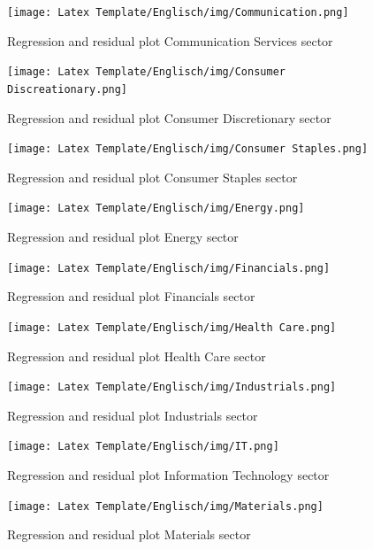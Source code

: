 \documentclass[a4paper,12pt]{article}
\begin{document}
\begin{figure}[!h]
  \centering
    \texttt{[image: Latex Template/Englisch/img/Communication.png]}
    \caption{Regression and residual plot Communication Services sector}
    \hfill
\end{figure}

\begin{figure}[!h]
  \centering
    \texttt{[image: Latex Template/Englisch/img/Consumer Discreationary.png]}
    \caption{Regression and residual plot Consumer Discretionary sector}
    \hfill
\end{figure}

\begin{figure}[!h]
  \centering
    \texttt{[image: Latex Template/Englisch/img/Consumer Staples.png]}
    \caption{Regression and residual plot Consumer Staples sector}
    \hfill
\end{figure}

\begin{figure}[!h]
  \centering
    \texttt{[image: Latex Template/Englisch/img/Energy.png]}
    \caption{Regression and residual plot Energy sector}
    \hfill
\end{figure}

\begin{figure}[!h]
  \centering
    \texttt{[image: Latex Template/Englisch/img/Financials.png]}
    \caption{Regression and residual plot Financials sector}
    \hfill
\end{figure}

\begin{figure}[!h]
  \centering
    \texttt{[image: Latex Template/Englisch/img/Health Care.png]}
    \caption{Regression and residual plot Health Care sector}
    \hfill
\end{figure}

\begin{figure}[!h]
  \centering
    \texttt{[image: Latex Template/Englisch/img/Industrials.png]}
    \caption{Regression and residual plot Industrials sector}
    \hfill
\end{figure}

\begin{figure}[!h]
  \centering
    \texttt{[image: Latex Template/Englisch/img/IT.png]}
    \caption{Regression and residual plot Information Technology sector}
    \hfill
\end{figure}

\begin{figure}[!h]
  \centering
    \texttt{[image: Latex Template/Englisch/img/Materials.png]}
    \caption{Regression and residual plot Materials sector}
    \hfill
\end{figure}
\end{document}
